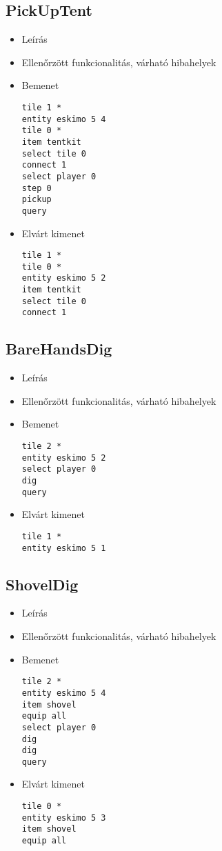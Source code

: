 \subsection{PickUpTent}
\begin{itemize}
\item Leírás\newline
\item Ellenőrzött funkcionalitás, várható hibahelyek
\item Bemenet
\begin{lstlisting}
tile 1 *
entity eskimo 5 4
tile 0 *
item tentkit
select tile 0
connect 1
select player 0
step 0
pickup
query
\end{lstlisting}
\item Elvárt kimenet
\begin{lstlisting}
tile 1 *
tile 0 *
entity eskimo 5 2
item tentkit
select tile 0
connect 1
\end{lstlisting}
\end{itemize}

\subsection{BareHandsDig}
\begin{itemize}
\item Leírás\newline
\item Ellenőrzött funkcionalitás, várható hibahelyek
\item Bemenet
\begin{lstlisting}
tile 2 *
entity eskimo 5 2
select player 0
dig
query
\end{lstlisting}
\item Elvárt kimenet
\begin{lstlisting}
tile 1 *
entity eskimo 5 1
\end{lstlisting}
\end{itemize}

\subsection{ShovelDig}
\begin{itemize}
\item Leírás\newline
\item Ellenőrzött funkcionalitás, várható hibahelyek
\item Bemenet
\begin{lstlisting}
tile 2 *
entity eskimo 5 4
item shovel
equip all
select player 0
dig
dig
query
\end{lstlisting}
\item Elvárt kimenet
\begin{lstlisting}
tile 0 *
entity eskimo 5 3
item shovel
equip all
\end{lstlisting}
\end{itemize}


